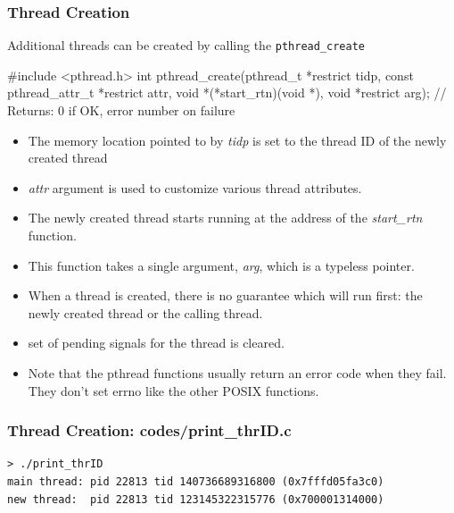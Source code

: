 \documentclass[newPxFont,sthlmFooter,nooffset]{beamer}
\begin{document}
\begin{frame}[fragile,t]
  \frametitle{Thread Creation}
  Additional threads can be created by calling the \texttt{pthread\_create}

  \begin{codedef}
#include <pthread.h>
int pthread_create(pthread_t *restrict tidp,
                   const pthread_attr_t *restrict attr,
                   void *(*start_rtn)(void *),
                   void *restrict arg);
// Returns: 0 if OK, error number on failure
  \end{codedef}

{\footnotesize
  \begin{itemize}
  \item The memory location pointed to by \textit{tidp} is set to the
    thread ID of the newly created thread
  \item \textit{attr} argument is used to customize various thread
    attributes.
  \item The newly created thread starts running at the address of the
    \textit{start\_rtn} function.
  \item This function takes a single argument, \textit{arg}, which is
    a typeless pointer.
  \item When a thread is created, there is no guarantee which will run
    first: the newly created thread or the calling thread.
  \item set of pending signals for the thread is cleared.
  \item Note that the pthread functions usually return an error code
    when they fail. They don’t set errno like the other POSIX
    functions.
  \end{itemize}
}
\end{frame}

\begin{frame}
  \frametitle{Thread Creation: codes/print\_thrID.c}



\begin{verbatim}
> ./print_thrID
main thread: pid 22813 tid 140736689316800 (0x7fffd05fa3c0)
new thread:  pid 22813 tid 123145322315776 (0x700001314000)
\end{verbatim}

\end{frame}
\end{document}
